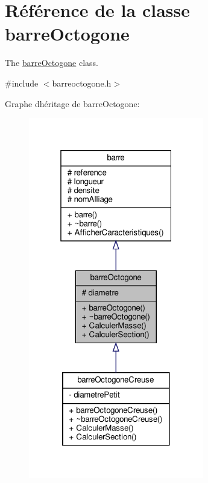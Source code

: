\hypertarget{classbarre_octogone}{}\section{Référence de la classe barre\+Octogone}
\label{classbarre_octogone}


The \hyperlink{classbarre_octogone}{barre\+Octogone} class.  




{\ttfamily \#include $<$barreoctogone.\+h$>$}



Graphe d\textquotesingle{}héritage de barre\+Octogone\+:
\nopagebreak
\begin{figure}[H]
\begin{center}
\leavevmode
\includegraphics[width=217pt]{classbarre_octogone__inherit__graph}
\end{center}
\end{figure}


